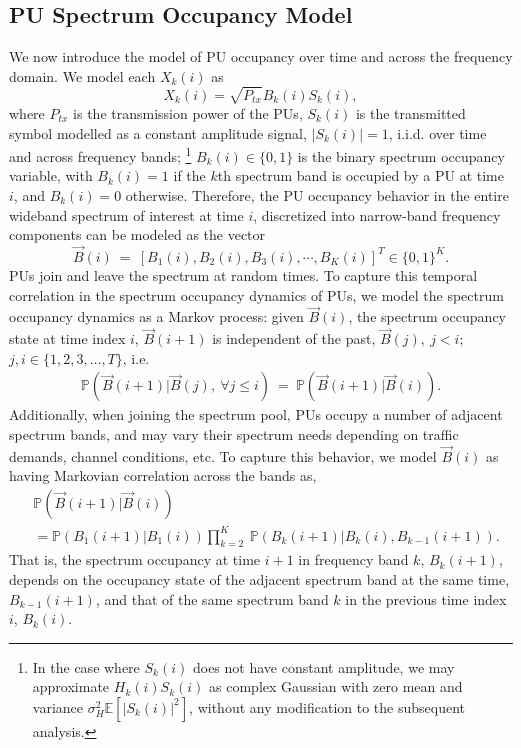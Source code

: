 \documentclass[10pt,twocolumn]{IEEEtran}
\begin{document}
\subsection{PU Spectrum Occupancy Model}
We now introduce the model of PU occupancy over time and across the frequency domain. We model each $X_k(i)$ as 
\begin{equation}\label{4}
    X_k(i)=\sqrt{P_{tx}}B_k(i)S_k(i),
\end{equation}
where $P_{tx}$ is the transmission power of the PUs, $S_k(i)$ is the transmitted symbol modelled as a constant amplitude signal, $|S_k(i)|=1$, i.i.d. over time and across frequency bands; \footnote{In the case where $S_k(i)$ does not have constant amplitude, we may approximate $H_{k}(i)S_{k}(i)$ as complex Gaussian with zero mean and variance $\sigma_H^2\mathbb E[|S_{k}(i)|^2]$, without any modification to the subsequent analysis.} $B_k(i)\in\{0,1\}$ is the binary spectrum occupancy variable, with $B_k(i)=1$ if the $k$th spectrum band is occupied by a PU at time $i$, and $B_k(i)=0$ otherwise. Therefore, the PU occupancy behavior in the entire wideband spectrum of interest at time $i$, discretized into narrow-band frequency components can be modeled as the vector 
\begin{equation}\label{5}
    \vec{B}(i)\ =\ [B_1(i),B_2(i),B_3(i),\cdots,B_K(i)]^T \in \{0,1\}^K.
\end{equation}
PUs join and leave the spectrum at random times. To capture this temporal correlation in the spectrum occupancy dynamics of PUs, we model the spectrum occupancy dynamics as a Markov process: given $\vec{B}(i)$, the spectrum occupancy state at time index $i$, $\vec{B}(i+1)$ is independent of the past, $\vec{B}(j),\ j < i$; $j, i \in \{1,2,3,\dots,T\}$, i.e. 
\begin{equation}\label{6}
    \begin{aligned}
        \mathbb{P}(\vec{B}(i+1)|\vec{B}(j),\ \forall j \leq i)\ =\ \mathbb{P}(\vec{B}(i+1)|\vec{B}(i)).
    \end{aligned}
\end{equation}
Additionally, when joining the spectrum pool, PUs occupy a number of adjacent spectrum bands, and may vary their spectrum needs depending on traffic demands, channel conditions, etc. To capture this behavior, we model $\vec{B}(i)$ as having Markovian correlation across the bands as, 
\begin{align}\label{7}
&         \mathbb{P}(\vec{B}(i+1)|\vec{B}(i))\\&=
\nonumber
         \mathbb{P}(B_{1}(i+1)|B_{1}(i))
         \prod_{k=2}^{K}\ \mathbb{P}(B_{k}(i+1)|B_{k}(i),B_{k-1}(i+1)).
\end{align}
That is, the spectrum occupancy at time $i+1$ in frequency band $k$, $B_{k}(i+1)$, depends on the  occupancy state of the adjacent spectrum band at the same time, $B_{k-1}(i+1)$, and that of the same spectrum band $k$ in the previous time index $i$, $B_{k}(i)$.
\end{document}
